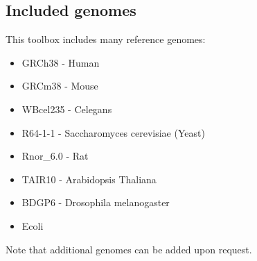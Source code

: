 \subsection{Included genomes \label{subsec:included_genomes}}
This toolbox includes many reference genomes:\\
\begin{itemize}
\item GRCh38 - Human
\item GRCm38 - Mouse
\item WBcel235 - Celegans
\item R64-1-1 - Saccharomyces cerevisiae (Yeast)
\item Rnor\_6.0 - Rat
\item TAIR10 - Arabidopsis Thaliana
\item BDGP6 - Drosophila melanogaster
\item Ecoli
\end{itemize}
Note that additional genomes can be added upon request.\\
